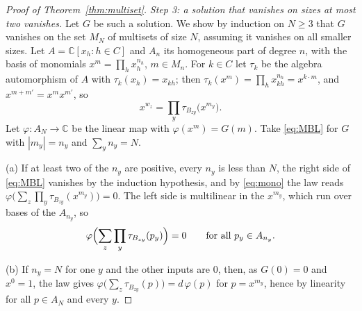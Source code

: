 \begin{proof}[Proof of Theorem~\ref{thm:multiset}]
\emph{Step 3: a solution that vanishes on sizes at most two vanishes.} Let $G$ be such a solution. We show by induction on $N\ge3$ that $G$ vanishes on the set $M_N$ of multisets of size $N$, assuming it vanishes on all smaller sizes. Let $A=\mathbb{C}[x_h:h\in C]$ and $A_n$ its homogeneous part of degree $n$, with the basis of monomials $x^m=\prod_hx_h^{n_h}$, $m\in M_n$. For $k\in C$ let $\tau_k$ be the algebra automorphism of $A$ with $\tau_k(x_h)=x_{kh}$; then $\tau_k(x^m)=\prod_hx_{kh}^{n_h}=x^{k\cdot m}$, and $x^{m+m'}=x^mx^{m'}$, so
\begin{equation}\label{eq:mono}
x^{w_z}=\prod_y\tau_{B_{zy}}\bigl(x^{m_y}\bigr).
\end{equation}
Let $\varphi\colon A_N\to\mathbb{C}$ be the linear map with $\varphi(x^m)=G(m)$. Take \eqref{eq:MBL} for $G$ with $|m_y|=n_y$ and $\sum_yn_y=N$.

(a) If at least two of the $n_y$ are positive, every $n_y$ is less than $N$, the right side of \eqref{eq:MBL} vanishes by the induction hypothesis, and by \eqref{eq:mono} the law reads $\varphi\bigl(\sum_z\prod_y\tau_{B_{zy}}(x^{m_y})\bigr)=0$. The left side is multilinear in the $x^{m_y}$, which run over bases of the $A_{n_y}$, so
\begin{equation}\label{eq:a}
\varphi\Bigl(\sum_z\prod_y\tau_{B_{zy}}(p_y)\Bigr)=0\qquad\text{for all }p_y\in A_{n_y}.
\end{equation}

(b) If $n_y=N$ for one $y$ and the other inputs are $0$, then, as $G(0)=0$ and $x^0=1$, the law gives $\varphi\bigl(\sum_z\tau_{B_{zy}}(p)\bigr)=d\,\varphi(p)$ for $p=x^{m_y}$, hence by linearity for all $p\in A_N$ and every $y$.


\end{proof}
